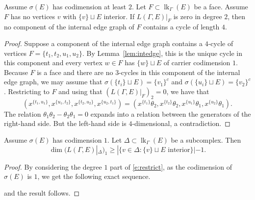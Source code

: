 \documentclass[ALCO, Unicode,published]{cedram}
\DeclareMathOperator{\lk}{lk}
\begin{document}
\begin{lemma}\label{lem:nofourcycle}
Assume $\sigma(E)$ has codimension at least $2$. Let $F \subset \lk_{\Gamma}(E)$ be a face. Assume $F$ has no vertices $v$ with $\{v\} \sqcup E$ interior. If $L(\Gamma, E)|_{F}$ is zero in degree $2$, then no component of the internal edge graph of $F$ contains a cycle of length $4$. 
\end{lemma}
\begin{proof}
Suppose a component of the internal edge graph contains a $4$-cycle of vertices $F = \{t_1, t_2, u_1, u_2\}$. By Lemma~\ref{lem:intedge}, this is the unique cycle in this component and every vertex $w \in F$ has $\{w\} \sqcup E$ of carrier codimension $1$. Because $F$ is a face and there are no $3$-cycles in this component of the internal edge graph, we may assume that $\sigma(\{t_i\} \sqcup E) = \{v_1\}^c$ and $\sigma(\{u_i\} \sqcup E) = \{v_2\}^c$. Restricting to $F$ and using that $(L(\Gamma, E)|_{F})_2 = 0$, we have that 
$$(x^{\{ t_1, u_1 \}}, x^{ \{ u_1, t_2\}}, x^{\{t_2,u_2\}}, x^{\{u_2, t_1\}}) = (x^{\{t_1\}} \theta_{2}, x^{\{t_2\}} \theta_{2}, x^{\{u_1\}} \theta_{1}, x^{\{u_2\}} \theta_{1}).$$
The relation $\theta_{1} \theta_{2} - \theta_{2} \theta_{1} = 0$ expands into a relation between the generators of the right-hand side. But the left-hand side is $4$-dimensional, a contradiction.
\end{proof}

\begin{lemma}\label{lem:cd1case}
Assume $\sigma(E)$ has codimension $1$. Let $\Delta \subset \lk_{\Gamma}(E)$ be a subcomplex. Then 
$$\dim (L(\Gamma, E)|_{\Delta})_1 \ge |\{v \in \Delta: \{v\} \sqcup E \text{ interior}\}| - 1.$$
\end{lemma}
\begin{proof}
By considering the degree $1$ part of \eqref{e:restrict}, as the codimension of $\sigma(E)$ is $1$, 
we get the following exact sequence.
\begin{center}
\end{center}
and the result follows. 
\end{proof}
\end{document}
